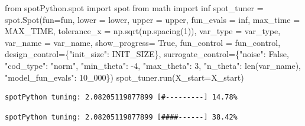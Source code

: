 \documentclass[
  letterpaper,
  DIV=11,
  numbers=noendperiod]{scrreprt}
\newenvironment{Shaded}{\begin{snugshade}}{\end{snugshade}}
\newcommand{\BuiltInTok}[1]{\textcolor[rgb]{0.00,0.23,0.31}{#1}}
\newcommand{\DecValTok}[1]{\textcolor[rgb]{0.68,0.00,0.00}{#1}}
\newcommand{\ImportTok}[1]{\textcolor[rgb]{0.00,0.46,0.62}{#1}}
\newcommand{\NormalTok}[1]{\textcolor[rgb]{0.00,0.23,0.31}{#1}}
\newcommand{\OperatorTok}[1]{\textcolor[rgb]{0.37,0.37,0.37}{#1}}
\newcommand{\StringTok}[1]{\textcolor[rgb]{0.13,0.47,0.30}{#1}}
\newcommand{\VariableTok}[1]{\textcolor[rgb]{0.07,0.07,0.07}{#1}}
\begin{document}
\begin{Shaded}
\begin{Highlighting}[]
\ImportTok{from}\NormalTok{ spotPython.spot }\ImportTok{import}\NormalTok{ spot}
\ImportTok{from}\NormalTok{ math }\ImportTok{import}\NormalTok{ inf}
\NormalTok{spot\_tuner }\OperatorTok{=}\NormalTok{ spot.Spot(fun}\OperatorTok{=}\NormalTok{fun,}
\NormalTok{                   lower }\OperatorTok{=}\NormalTok{ lower,}
\NormalTok{                   upper }\OperatorTok{=}\NormalTok{ upper,}
\NormalTok{                   fun\_evals }\OperatorTok{=}\NormalTok{ inf,}
\NormalTok{                   max\_time }\OperatorTok{=}\NormalTok{ MAX\_TIME,}
\NormalTok{                   tolerance\_x }\OperatorTok{=}\NormalTok{ np.sqrt(np.spacing(}\DecValTok{1}\NormalTok{)),}
\NormalTok{                   var\_type }\OperatorTok{=}\NormalTok{ var\_type,}
\NormalTok{                   var\_name }\OperatorTok{=}\NormalTok{ var\_name,}
\NormalTok{                   show\_progress}\OperatorTok{=} \VariableTok{True}\NormalTok{,}
\NormalTok{                   fun\_control }\OperatorTok{=}\NormalTok{ fun\_control,}
\NormalTok{                   design\_control}\OperatorTok{=}\NormalTok{\{}\StringTok{"init\_size"}\NormalTok{: INIT\_SIZE\},}
\NormalTok{                   surrogate\_control}\OperatorTok{=}\NormalTok{\{}\StringTok{"noise"}\NormalTok{: }\VariableTok{False}\NormalTok{,}
                                      \StringTok{"cod\_type"}\NormalTok{: }\StringTok{"norm"}\NormalTok{,}
                                      \StringTok{"min\_theta"}\NormalTok{: }\OperatorTok{{-}}\DecValTok{4}\NormalTok{,}
                                      \StringTok{"max\_theta"}\NormalTok{: }\DecValTok{3}\NormalTok{,}
                                      \StringTok{"n\_theta"}\NormalTok{: }\BuiltInTok{len}\NormalTok{(var\_name),}
                                      \StringTok{"model\_fun\_evals"}\NormalTok{: }\DecValTok{10\_000}\NormalTok{\})}
\NormalTok{spot\_tuner.run(X\_start}\OperatorTok{=}\NormalTok{X\_start)}
\end{Highlighting}
\end{Shaded}

\begin{verbatim}
spotPython tuning: 2.08205119877899 [#---------] 14.78% 
\end{verbatim}

\begin{verbatim}
spotPython tuning: 2.08205119877899 [####------] 38.42% 
\end{verbatim}
\end{document}
